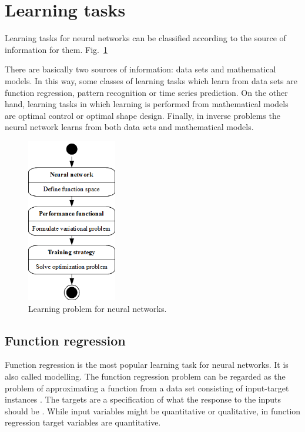 \section{Learning tasks}\label{LearningTasks}

Learning tasks for neural networks can be classified according to the source of information for them. Fig.~\ref{LearningActivityDiagram}

There are basically two sources of information: data sets and mathematical models. 
In this way, some classes of learning tasks which learn from data sets are function regression, pattern recognition or time series prediction. 
On the other hand, learning tasks in which learning is performed from mathematical models are optimal control or optimal shape design. 
Finally, in inverse problems the neural network learns from both data sets and mathematical models.

\begin{figure}[h!]
	\begin{center}
		\includegraphics[width=0.35\textwidth]{neural_networks_basis/learning_problem}
		\caption{Learning problem for neural networks.}\label{LearningActivityDiagram}
	\end{center}
\end{figure}

\subsection{Function regression}

Function regression is the most popular learning task for neural networks. 
It is also called modelling. The function regression problem can be regarded as the problem of
approximating a function from a data set consisting of input-target instances
\cite{Haykin1994}. The targets are a specification
of what the response to the inputs should be \cite{Bishop1995}. 
While input variables might be quantitative or qualitative, in function regression target variables are quantitative. 

